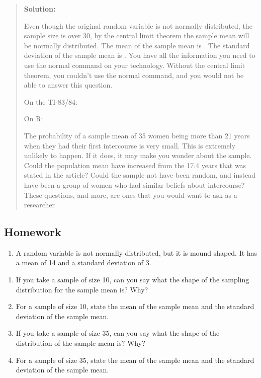\documentclass[]{book}
\providecommand{\tightlist}{%
  \setlength{\itemsep}{0pt}\setlength{\parskip}{0pt}}
\begin{document}
\begin{quote}
\textbf{Solution:}

Even though the original random variable is not normally distributed,
the sample size is over 30, by the central limit theorem the sample
mean will be normally distributed. The mean of the sample mean is .
The standard deviation of the sample mean is . You have all the
information you need to use the normal command on your technology.
Without the central limit theorem, you couldn't use the normal
command, and you would not be able to answer this question.

On the TI-83/84:

On R:

The probability of a sample mean of 35 women being more than 21 years
when they had their first intercourse is very small. This is extremely
unlikely to happen. If it does, it may make you wonder about the
sample. Could the population mean have increased from the 17.4 years
that was stated in the article? Could the sample not have been random,
and instead have been a group of women who had similar beliefs about
intercourse? These questions, and more, are ones that you would want
to ask as a researcher
\end{quote}

\hypertarget{homework-19}{%
\subsection{Homework}\label{homework-19}}

\begin{enumerate}
\def\labelenumi{\arabic{enumi}.}
\tightlist
\item
  A random variable is not normally distributed, but it is mound shaped. It has a mean of 14 and a standard deviation of 3.
\end{enumerate}

\begin{enumerate}
\def\labelenumi{\alph{enumi}.}
\item
  If you take a sample of size 10, can you say what the shape of the sampling distribution for the sample mean is? Why?
\item
  For a sample of size 10, state the mean of the sample mean and the standard deviation of the sample mean.
\item
  If you take a sample of size 35, can you say what the shape of the distribution of the sample mean is? Why?
\item
  For a sample of size 35, state the mean of the sample mean and the standard deviation of the sample mean.
\end{enumerate}
\end{document}
